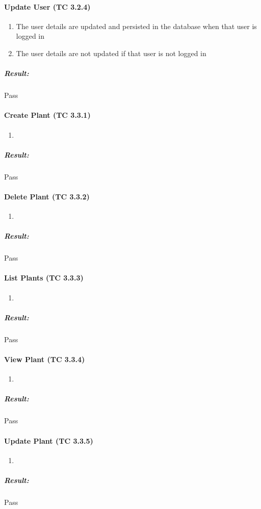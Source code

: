 \documentclass{article}
\begin{document}
			\paragraph{Update User (TC 3.2.4)}
				\begin{enumerate}
					\item The user details are updated and persisted in the database when that user is logged in
					\item The user details are not updated if that user is not logged in
				\end{enumerate}
				\subparagraph{Result: } Pass
			
			\paragraph{Create Plant (TC 3.3.1)}
				\begin{enumerate}
					\item 
				\end{enumerate}
				\subparagraph{Result: } Pass
				
			\paragraph{Delete Plant (TC 3.3.2)}
				\begin{enumerate}
					\item 
				\end{enumerate}
				\subparagraph{Result: } Pass
				
			\paragraph{List Plants (TC 3.3.3)}
				\begin{enumerate}
					\item 
				\end{enumerate}
				\subparagraph{Result: } Pass
				
			\paragraph{View Plant (TC 3.3.4)}
				\begin{enumerate}
					\item 
				\end{enumerate}
				\subparagraph{Result: } Pass
				
			\paragraph{Update Plant (TC 3.3.5)}
				\begin{enumerate}
					\item 
				\end{enumerate}
				\subparagraph{Result: } Pass
				
\end{document}
